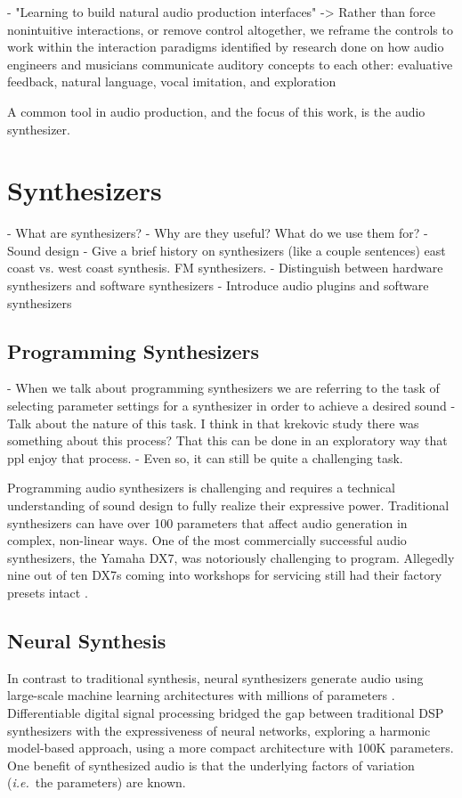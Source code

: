 - \cite{pardo2019learning} "Learning to build natural audio production interfaces" -> Rather than force nonintuitive interactions, or remove control altogether, we reframe the controls to work within the interaction paradigms identified by research done on how audio engineers and musicians communicate auditory concepts to each other: evaluative feedback, natural language, vocal imitation, and exploration

A common tool in audio production, and the focus of this work, is the audio synthesizer.

\section{Synthesizers}
- What are synthesizers?
- Why are they useful? What do we use them for?
- Sound design
- Give a brief history on synthesizers (like a couple sentences) east coast vs. west coast synthesis. FM synthesizers.
- Distinguish between hardware synthesizers and software synthesizers
- Introduce audio plugins and software synthesizers

\subsection{Programming Synthesizers}
- When we talk about programming synthesizers we are referring to the task of selecting parameter settings for a synthesizer in order to achieve a desired sound
- Talk about the nature of this task. I think in that krekovic study there was something about this process? That this can be done in an exploratory way that ppl enjoy that process.
- Even so, it can still be quite a challenging task.

Programming audio synthesizers is challenging and requires a technical understanding of sound design to fully realize their expressive power. Traditional synthesizers can have over 100 parameters that affect audio generation in complex, non-linear ways. One of the most commercially successful audio synthesizers, the Yamaha DX7, was notoriously challenging to program. Allegedly nine out of ten DX7s coming into workshops for servicing still had their factory presets intact \cite{seago2004critical}.

\subsection{Neural Synthesis}
In contrast to traditional synthesis, neural synthesizers generate audio using large-scale machine learning architectures with millions of parameters \cite{engel2017neural}. Differentiable digital signal processing \cite{engel2020ddsp} bridged the gap between traditional DSP synthesizers with the expressiveness of neural networks, exploring a harmonic model-based approach, using a more compact architecture with 100K parameters.
One benefit of synthesized audio is that the underlying factors of variation ({\em i.e.}~the parameters) are known.


